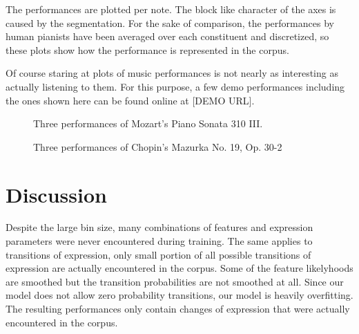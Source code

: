 \documentclass[a4paper,10pt]{article}
\begin{document}
The performances are plotted per note. The block like character of the axes is caused by the segmentation. For the sake of comparison, the performances by human pianists have been averaged over each constituent and discretized, so these plots show how the performance is represented in the corpus.

Of course staring at plots of music performances is not nearly as interesting as actually listening to them. For this purpose, a few demo performances including the ones shown here can be found online at [DEMO URL].


\begin{figure}
\centering
{}
\caption{Three performances of Mozart's Piano Sonata 310 III.}
\label{fig:mozartperformances}
\end{figure}

\begin{figure}
\centering
{}
\caption{Three performances of Chopin's Mazurka No. 19, Op. 30-2}
\label{fig:chopinperformances}
\end{figure}



\section{Discussion}
\label{sec:discussion}


Despite the large bin size, many combinations of features and expression parameters were never encountered during training. The same applies to transitions of expression, only small portion of all possible transitions of expression are actually encountered in the corpus. Some of the feature likelyhoods are smoothed but the transition probabilities are not smoothed at all. Since our model does not allow zero probability transitions, our model is heavily overfitting. The resulting performances only contain changes of expression that were actually encountered in the corpus.
\end{document}

